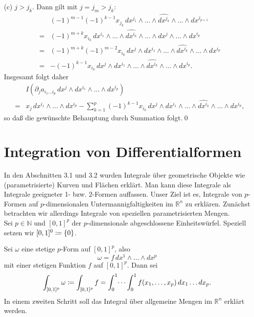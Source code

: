 \documentclass[a4paper,twoside,DIV15,BCOR12mm]{scrbook}
\begin{document}
\noindent
(c) $j > j_{k}$. Dann gilt mit $j = j_{m} > j_{k}$:
\begin{eqnarray*}
&   & (-1)^{m-1}(-1)^{k-1} x_{j_k} \, dx^{j_1} \wedge \dots \wedge 
\widehat{dx^{j_k}} \wedge \dots \wedge dx^{j_{p+1}} \\
& = & (-1)^{m+k} x_{i_k} \, dx^{i_1} \wedge \dots \wedge 
\widehat{dx^{i_k}} \wedge \dots \wedge dx^{j} \wedge \dots \wedge 
dx^{i_p} \\
& = & (-1)^{m+k} (-1)^{m-2} x_{i_k} \, dx^{j} \wedge dx^{i_1} \wedge 
\dots \wedge \widehat{dx^{i_k}} \wedge \dots \wedge dx^{i_p} \\
& = & -(-1)^{k-1} x_{i_k} \, dx^{j} \wedge dx^{i_1} \wedge \dots 
\wedge \widehat{dx^{i_k}} \wedge \dots \wedge dx^{i_p}.
\end{eqnarray*}
Insgesamt folgt daher
\begin{eqnarray*}
&   & I(\partial_{j} a_{i_{1}\dots i_{p}} \, dx^{j} \wedge dx^{i_1} 
\wedge \dots \wedge dx^{i_p}) \\
& = & x_{j} \, dx^{i_1} \wedge \dots \wedge dx^{i_p} - 
\sum_{k=1}^{p} (-1)^{k-1} x_{i_k} \, dx^{j} \wedge dx^{i_1} \wedge 
\dots \wedge \widehat{dx^{i_k}} \wedge \dots \wedge dx^{i_p},
\end{eqnarray*}
so daß die gewünschte Behauptung durch Summation folgt.\qed\\




\section{Integration von Differentialformen}




In den Abschnitten 3.1 und 3.2 wurden Integrale über geometrische 
Objekte wie (parametrisierte) Kurven und Flächen erklärt. Man kann 
diese Integrale als Integrale geeigneter 1- bzw. 2-Formen auffassen. 
Unser Ziel ist es, Integrale von $p$-Formen auf $p$-dimensionalen 
Untermannigfaltigkeiten im ${\mathbb R}^{n}$ zu erklären. Zunächst 
betrachten wir allerdings Integrale von speziellen parametrisierten 
Mengen.\\


\noindent
Sei $p \in {\mathbb N}$ und $[0,1]^{p}$ der $p$-dimensionale 
abgeschlossene Einheitswürfel. Speziell setzen wir $[0,1]^{0} \da  \{0\}$.

\bigskip

 Sei $\omega$ eine stetige $p$-Form auf 
$[0,1]^{p}$, also
\[ \omega = f \, dx^{1} \wedge \dots \wedge dx^{p} \]
mit einer stetigen Funktion $f$ auf $[0,1]^{p}$. Dann sei
\[ \int_{[0,1]^{p}} \omega \da  \int_{[0,1]^{p}} f = \int_{0}^{1} \dots 
\int_{0}^{1} f(x_{1},\dots,x_{p}) \, dx_{1} \dots dx_{p}. \]
In einem zweiten Schritt soll das Integral über allgemeine Mengen 
im ${\mathbb R}^{n}$ erklärt werden.
\end{document}
